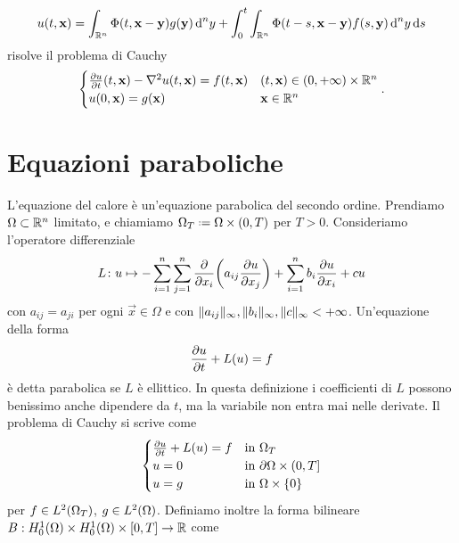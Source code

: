 \begin{equation}
    u(t,\vec x)=\int_{\R^n}\sfc(t,\vec x-\vec y)g(\vec y)\,\dd^ny+\int_0^t\int_{\R^n}\sfc(t-s,\vec x-\vec y)f(s,\vec y)\,\dd^ny\,\dd s
    \label{eq:soluzione-generale-equazione-calore}
\end{equation}
risolve il problema di Cauchy
\begin{equation}
    \begin{cases}
        \drp{u}{t}(t,\vec x)-\lap u(t,\vec x)=f(t,\vec x) & (t,\vec x)\in(0,+\infty)\times\R^n\\
        u(0,\vec x)=g(\vec x)                             & \vec x\in\R^n
    \end{cases}.
    \label{eq:problema-cauchy-equazione-calore}
\end{equation}

\section{Equazioni paraboliche}
L'equazione del calore è un'equazione parabolica del secondo ordine.
Prendiamo $\Omega\subset\R^n$ limitato, e chiamiamo $\Omega_T\defeq\Omega\times(0,T)$ per $T>0$.
Consideriamo l'operatore differenziale
\begin{equation}
    L\colon u\mapsto-\sum_{i=1}^n\sum_{j=1}^n\drp{}{x_i}\biggl(a_{ij}\drp{u}{x_j}\biggr)+\sum_{i=1}^nb_i\drp{u}{x_i}+cu
\end{equation}
con $a_{ij}=a_{ji}$ per ogni $\vec x\in\Omega$ e con $\norm{a_{ij}}_\infty,\norm{b_i}_\infty,\norm{c}_\infty<+\infty$.
Un'equazione della forma
\begin{equation}
    \drp{u}{t}+L(u)=f
\end{equation}
è detta parabolica se $L$ è ellittico.
In questa definizione i coefficienti di $L$ possono benissimo anche dipendere da $t$, ma la variabile non entra mai nelle derivate.
Il problema di Cauchy si scrive come
\begin{equation}
    \begin{cases}
        \drp{u}{t}+L(u)=f & \text{in }\Omega_T\\
        u=0               & \text{in }\boundary\Omega\times(0,T]\\
        u=g               & \text{in }\Omega\times\{0\}
    \end{cases}
    \label{eq:problema-cauchy-parabolico}
\end{equation}
per $f\in\leb[2]{\Omega_T}$, $g\in\leb[2]{\Omega}$.
Definiamo inoltre la forma bilineare $B:\sobHc[1]{\Omega}\times\sobHc[1]{\Omega}\times[0,T]\to\R$ come
